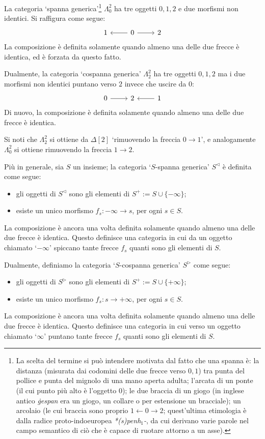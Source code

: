 \begin{example}\label{ex_spancospan}
	La categoria `spanna generica'\footnote{La scelta del termine si può intendere motivata dal fatto che una spanna è: la distanza (misurata dai codomini delle due frecce verso $0,1$) tra punta del pollice e punta del mignolo di una mano aperta adulta; l'arcata di un ponte (il cui punto più alto è l'oggetto $0$); le due braccia di un giogo (in inglese antico \emph{ġespan} era un giogo, un collare o per estensione un bracciale); un arcolaio (le cui braccia sono proprio $1\leftarrow 0\to 2$; quest'ultima etimologia è dalla radice proto-indoeuropea \emph{*(s)penh$_1$-}, da cui derivano varie parole nel campo semantico di ciò che è capace di ruotare attorno a un asse).}
\(\Lambda^2_0\) ha tre oggetti \(0,1,2\) e due morfismi non identici. Si raffigura come segue:
	\[\begin{tikzcd}
			1 & 0 \ar[r]\ar[l] & 2
		\end{tikzcd}\]
	La composizione è definita solamente quando almeno una delle due frecce è identica, ed è forzata da questo fatto.

	Dualmente, la categoria `cospanna generica' \(\Lambda^2_2\) ha tre oggetti \(0,1,2\) ma i due morfismi non identici puntano verso \(2\) invece che uscire da \(0\):
	\[\begin{tikzcd}
			0\ar[r] & 2 & 1\ar[l]
		\end{tikzcd}\]
	Di nuovo, la composizione è definita solamente quando almeno una delle due frecce è identica.

	Si noti che \(\Lambda^2_2\) si ottiene da \(\Delta[2]\) `rimuovendo la freccia \(0\to 1\)', e analogamente \(\Lambda^2_0\) si ottiene rimuovendo la freccia \(1\to 2\).

	Più in generale, sia \(S\) un insieme; la categoria `\(S\)-spanna generica' \(S^\lhd\) è definita come segue:
	\begin{itemize}
		\item gli oggetti di \(S^\lhd\) sono gli elementi di \(S^+ := S\cup \{-\infty\}\);
		\item esiste un unico morfismo \(f_s : -\infty\to s\), per ogni \(s\in S\).
	\end{itemize}
	La composizione è ancora una volta definita solamente quando almeno una delle due frecce è identica. Questo definisce una categoria in cui da un oggetto chiamato `\(-\infty\)' spiccano tante frecce \(f_s\) quanti sono gli elementi di \(S\).

	Dualmente, definiamo la categoria `\(S\)-cospanna generica' \(S^\rhd\) come segue:
	\begin{itemize}
		\item gli oggetti di \(S^\rhd\) sono gli elementi di \(S^+ := S\cup \{+\infty\}\);
		\item esiste un unico morfismo \(f_s : s\to+\infty\), per ogni \(s\in S\).
	\end{itemize}
	La composizione è ancora una volta definita solamente quando almeno una delle due frecce è identica. Questo definisce una categoria in cui verso un oggetto chiamato `\(\infty\)' puntano tante frecce \(f_s\) quanti sono gli elementi di \(S\).


\end{example}
